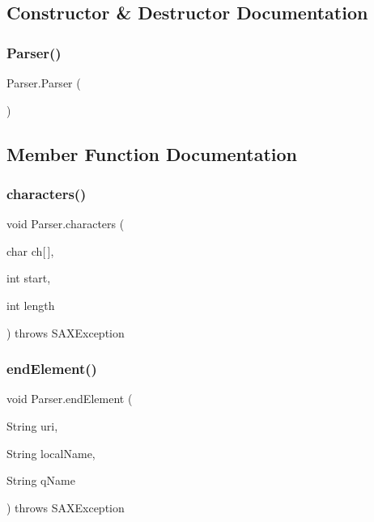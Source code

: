 \subsection{Constructor \& Destructor Documentation}
\hypertarget{class_parser_a5b20dc7a1c7a26ce3cec6cc070839bd4}{}\label{class_parser_a5b20dc7a1c7a26ce3cec6cc070839bd4} 
\subsubsection{\texorpdfstring{Parser()}{Parser()}}
{\footnotesize\ttfamily Parser.\+Parser (\begin{DoxyParamCaption}{ }\end{DoxyParamCaption})}



\subsection{Member Function Documentation}
\hypertarget{class_parser_a47bcfb67533ee080c38771c5487edd90}{}\label{class_parser_a47bcfb67533ee080c38771c5487edd90} 
\subsubsection{\texorpdfstring{characters()}{characters()}}
{\footnotesize\ttfamily void Parser.\+characters (\begin{DoxyParamCaption}\item[{char}]{ch\mbox{[}$\,$\mbox{]},  }\item[{int}]{start,  }\item[{int}]{length }\end{DoxyParamCaption}) throws S\+A\+X\+Exception}

\hypertarget{class_parser_a6235e3c77c809f5012c95629345e0f2f}{}\label{class_parser_a6235e3c77c809f5012c95629345e0f2f} 
\subsubsection{\texorpdfstring{end\+Element()}{endElement()}}
{\footnotesize\ttfamily void Parser.\+end\+Element (\begin{DoxyParamCaption}\item[{String}]{uri,  }\item[{String}]{local\+Name,  }\item[{String}]{q\+Name }\end{DoxyParamCaption}) throws S\+A\+X\+Exception}

